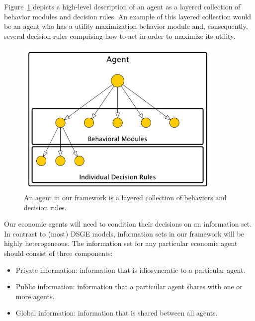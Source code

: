 \documentclass[a4paper]{article}
\begin{document}
Figure~\ref{fig:BehaviorImage} depicts a high-level description of an agent as a layered collection of behavior modules and decision rules. An example of this layered collection would be an agent who has a utility maximization behavior module and, consequently, several decision-rules comprising how to act in order to maximize its utility. 

\begin{figure}
\centering
\includegraphics[width=10cm]{img/hierarchical-actor.pdf}
\caption{An agent in our framework is a layered collection of behaviors and decision rules.}
\label{fig:BehaviorImage}
\end{figure}

Our economic agents will need to condition their decisions on an information set. In contrast to (most) DSGE models, information sets in our framework will be highly heterogeneous. The information set for any particular economic agent should consist of three components:
\begin{itemize}
    \item Private information: information that is idiosyncratic to a particular agent. 
    \item Public information: information that a particular agent shares with one or more agents.
    \item Global information: information that is shared between all agents.
\end{itemize}
\end{document}
